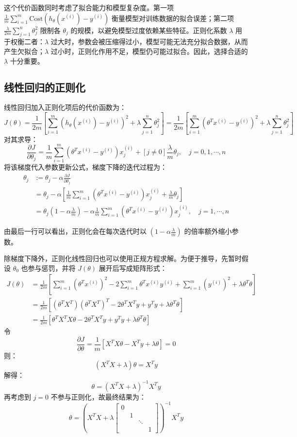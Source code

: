 这个代价函数同时考虑了拟合能力和模型复杂度。第一项 $\frac{1}{m}\sum_{i=1}^m\text{Cost}\left(h_\theta(x^{(i)})-y^{(i)}\right)$ 衡量模型对训练数据的拟合误差；第二项 $\frac{\lambda}{2m}\sum_{j=1}^n\theta_j^2$ 限制各 $\theta_j$ 的规模，以避免模型过度依赖某些特征。正则化系数 $\lambda$ 用于权衡二者：$\lambda$ 过大时，参数会被压缩得过小，模型可能无法充分拟合数据，从而产生欠拟合；$\lambda$ 过小时，正则化作用不足，模型仍可能过拟合。因此，选择合适的 $\lambda$ 十分重要。


\subsection{线性回归的正则化}

线性回归加入正则化项后的代价函数为：
\[
J(\theta)=\frac{1}{2m}\left[\sum_{i=1}^m\left(h_\theta(x^{(i)})-y^{(i)}\right)^2+\lambda\sum_{j=1}^n\theta_j^2\right]
=\frac{1}{2m}\left[\sum_{i=1}^m\left(\theta^Tx^{(i)}-y^{(i)}\right)^2+\lambda\sum_{j=1}^n\theta_j^2\right]
\]
对其求导：
\[
\frac{\partial J}{\partial \theta_j}=\frac{1}{m}\sum_{i=1}^m\left(\theta^Tx^{(i)}-y^{(i)}\right)x^{(i)}_j+[j\neq 0]\frac{\lambda}{m}\theta_j,\quad j=0,1,\cdots,n
\]
将该梯度代入参数更新公式，梯度下降的迭代过程为：
\begin{align*}
\theta_j&:=\theta_j-\alpha \frac{\partial J}{\partial \theta_j}\\
&=\theta_j-\alpha \left[\frac{1}{m}\sum_{i=1}^m\left(\theta^Tx^{(i)}-y^{(i)}\right)x^{(i)}_j+\frac{\lambda}{m}\theta_j\right]\\
&=\theta_j\left(1-\alpha\frac{\lambda}{m}\right)-\alpha\frac{1}{m}\sum_{i=1}^m\left(\theta^Tx^{(i)}-y^{(i)}\right)x^{(i)}_j,\quad j=1,\cdots,n
\end{align*}

由最后一行可以看出，正则化会在每次迭代时以 $(1-\alpha\frac{\lambda}{m})$ 的倍率额外缩小参数。

除梯度下降外，正则化线性回归也可以使用正规方程求解。为便于推导，先暂时假设 $\theta_0$ 也参与惩罚，并将 $J(\theta)$ 展开后写成矩阵形式：
\begin{align*}
J(\theta)&=\frac{1}{2m}\left[\sum_{i=1}^m\left(\theta^Tx^{(i)}\right)^2-2\sum_{i=1}^m\theta^Tx^{(i)}y^{(i)}+\sum_{i=1}^m\left(y^{(i)}\right)^2+\lambda\theta^T\theta\right]\\
&=\frac{1}{2m}\left[\left(\theta^TX^T\right)\left(\theta^TX^T\right)^T-2\theta^TX^Ty+y^Ty+\lambda\theta^T\theta\right]\\
&=\frac{1}{2m}\left[\theta^TX^TX\theta-2\theta^TX^Ty+y^Ty+\lambda\theta^T\theta\right]
\end{align*}
令
\[
\frac{\partial J}{\partial \theta}=\frac{1}{m}\left[X^TX\theta-X^Ty+\lambda\theta\right]=0
\]
则：
\[
(X^TX+\lambda)\theta=X^Ty
\]
解得：
\[
\theta=(X^TX+\lambda)^{-1}X^Ty
\]
再考虑到 $j=0$ 不参与正则化，故最终结果为：
\[
\theta=\left(X^TX+\lambda\begin{bmatrix}0&&&\\&1&&\\&&\ddots&\\&&&1\end{bmatrix}\right)^{-1}X^Ty
\]


